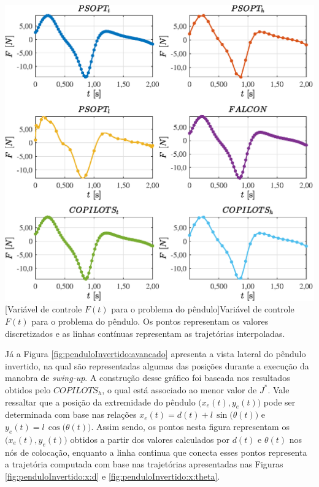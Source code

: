 \noindent
\begin{minipage}{\textwidth}
	\vspace{\onelineskip}
	\centering
	\includegraphics[scale=0.7]{fig/resultados/penduloInvertido/traj/u/F}
	[Variável de controle $F(t)$ para o problema do pêndulo]{Variável de controle $F(t)$ para o problema do pêndulo. Os pontos representam os valores discretizados e as linhas contínuas representam as trajetórias interpoladas.}
	\label{fig:penduloInvertido:u:F}
	\vspace{\onelineskip}
\end{minipage}



Já a Figura \ref{fig:penduloInvertido:avancado} apresenta a  vista lateral do pêndulo invertido, na qual são representadas algumas das posições durante a execução da manobra de \textit{swing-up}. A construção desse gráfico foi baseada nos resultados obtidos pelo $ COPILOTS_h $, o qual está associado ao menor valor de $ J^* $. Vale ressaltar que a posição da extremidade do pêndulo $ \big( x_e(t), y_e(t) \big) $ pode ser determinada com base nas relações $ x_e(t) = d(t) + l \, \sin\big( \theta(t) \big) $ e $ y_e(t) = l \, \cos \big( \theta(t) \big) $. Assim sendo, os pontos nesta figura representam os $ \big( x_e(t), y_e(t) \big) $ obtidos a partir dos valores calculados por $ d(t) $ e $ \theta(t) $ nos nós de colocação, enquanto a linha continua que conecta esses pontos representa a trajetória computada com base nas trajetórias apresentadas nas Figuras \ref{fig:penduloInvertido:x:d} e \ref{fig:penduloInvertido:x:theta}.

